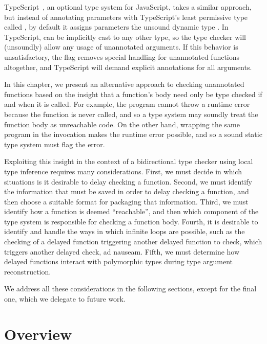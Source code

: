 TypeScript~\cite{typescript}, an optional type system for JavaScript,
takes a similar approach, but instead of annotating parameters with
TypeScript's least permissive type called ,
by default it assigns parameters the unsound dynamic type .
In TypeScript,  can be implicitly cast to any other type,
so the type checker will (unsoundly) allow any usage of unannotated arguments.
If this behavior is unsatisfactory,
the  flag removes special handling for unannotated
functions altogether, and TypeScript will demand explicit annotations for all arguments.

In this chapter, we present an alternative approach to checking unannotated functions
based on the insight that a function's body need only be type checked if and when it is called.
For example, the program  cannot throw a runtime error because
the function is never called, and so a type system may soundly treat the function body as unreachable code.
On the other hand, wrapping the same program in the invocation
makes the runtime error possible, and so a sound static type system must flag the error.

Exploiting this insight in the context of a bidirectional type checker using
local type inference requires many considerations.
First, we must decide in which situations is it desirable to delay checking a function.
Second, we must identify the information that must be saved in order to delay checking a function,
and then choose a suitable format for packaging that information.
Third, we must identify how a function is deemed ``reachable'',
and then which component of the type system is responsible for checking a function body.
Fourth, it is desirable to identify and handle the ways in which 
infinite loops are possible, such as the checking of a delayed function triggering
another delayed function to check, which triggers another delayed check, ad nauseam.
Fifth, we must determine how delayed functions interact with polymorphic types
during type argument reconstruction.

We address all these considerations in the following sections, except
for the final one, which we delegate to future work. %

\section{Overview}
\label{symbolic:section:overview}

